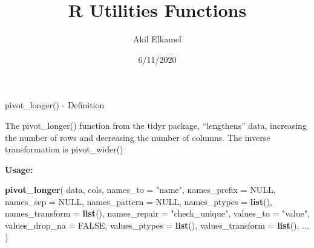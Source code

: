 \documentclass[
  ignorenonframetext,
]{beamer}
\title{R Utilities Functions}
\author{Akil Elkamel}
\date{6/11/2020}
\newenvironment{Shaded}{\begin{snugshade}}{\end{snugshade}}
\newcommand{\DataTypeTok}[1]{\textcolor[rgb]{0.13,0.29,0.53}{#1}}
\newcommand{\KeywordTok}[1]{\textcolor[rgb]{0.13,0.29,0.53}{\textbf{#1}}}
\newcommand{\NormalTok}[1]{#1}
\newcommand{\OtherTok}[1]{\textcolor[rgb]{0.56,0.35,0.01}{#1}}
\newcommand{\StringTok}[1]{\textcolor[rgb]{0.31,0.60,0.02}{#1}}
\begin{document}
\frame{\titlepage}

\begin{frame}[fragile]{pivot\_longer() - Definition}
\protect\hypertarget{pivot_longer---definition}{}

The pivot\_longer() function from the tidyr package, ``lengthens'' data,
increasing the number of rows and decreasing the number of columns. The
inverse transformation is pivot\_wider()

\textbf{Usage:}

\begin{Shaded}
\begin{Highlighting}[]
\KeywordTok{pivot_longer}\NormalTok{(}
\NormalTok{  data,}
\NormalTok{  cols,}
  \DataTypeTok{names_to =} \StringTok{"name"}\NormalTok{,}
  \DataTypeTok{names_prefix =} \OtherTok{NULL}\NormalTok{,}
  \DataTypeTok{names_sep =} \OtherTok{NULL}\NormalTok{,}
  \DataTypeTok{names_pattern =} \OtherTok{NULL}\NormalTok{,}
  \DataTypeTok{names_ptypes =} \KeywordTok{list}\NormalTok{(),}
  \DataTypeTok{names_transform =} \KeywordTok{list}\NormalTok{(),}
  \DataTypeTok{names_repair =} \StringTok{"check_unique"}\NormalTok{,}
  \DataTypeTok{values_to =} \StringTok{"value"}\NormalTok{,}
  \DataTypeTok{values_drop_na =} \OtherTok{FALSE}\NormalTok{,}
  \DataTypeTok{values_ptypes =} \KeywordTok{list}\NormalTok{(),}
  \DataTypeTok{values_transform =} \KeywordTok{list}\NormalTok{(),}
\NormalTok{  ...}
\NormalTok{)}
\end{Highlighting}
\end{Shaded}

\end{frame}
\end{document}
